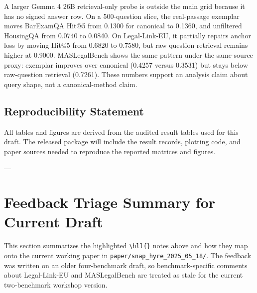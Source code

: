 A larger Gemma 4 26B retrieval-only probe is outside the main grid because it
has no signed answer row. On a 500-question slice, the
real-passage exemplar moves BarExamQA Hit@5 from 0.1300 for canonical \hyre{}
to 0.1360, and unfiltered HousingQA from 0.0740 to 0.0840. On Legal-Link-EU,
it partially repairs anchor loss by moving \hyre{} Hit@5 from 0.6820 to
0.7580, but raw-question retrieval remains higher at 0.9000. MASLegalBench
shows the same pattern under the same-source proxy: exemplar \hyre{} improves
over canonical \hyre{} (0.4257 versus 0.3531) but stays below raw-question
retrieval (0.7261). These numbers support an analysis claim about query shape,
not a canonical-method claim.

\subsection{Reproducibility Statement}

All tables and figures are derived from the audited result tables used for this
draft. The released package will include the result records, plotting code, and
paper sources needed to reproduce the reported matrices and figures.

---
\section*{Feedback Triage Summary for Current Draft}

This section summarizes the highlighted \texttt{\textbackslash hll\{\}} notes
above and how they map onto the current working paper in
\texttt{paper/snap\_hyre\_2025\_05\_18/}. The feedback was written on an older
four-benchmark draft, so benchmark-specific comments about Legal-Link-EU and
MASLegalBench are treated as stale for the current two-benchmark workshop
version.

